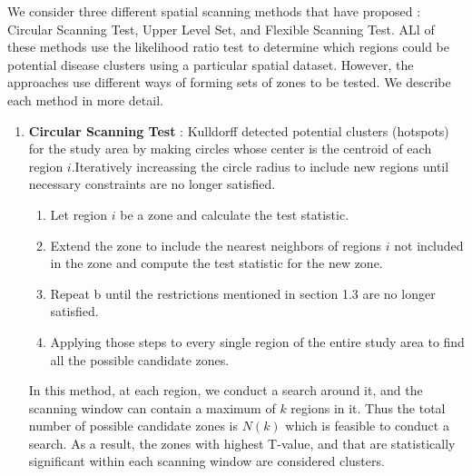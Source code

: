 \documentclass[12pt]{article}
\begin{document}
				We consider three different spatial scanning methods that have proposed : Circular Scanning Test, Upper Level Set, and Flexible Scanning Test. ALl of these methods use the likelihood ratio test to determine which regions could be potential disease clusters using a particular spatial dataset. However, the approaches use different ways of forming sets of zones to be tested. We describe each method in more detail.\\			
				\begin{enumerate}
			\item \textbf{Circular Scanning Test} : Kulldorff detected potential clusters (hotspots) for the study area by making circles whose center is the centroid of each region $i$.Iteratively increassing the circle radius to include new regions until necessary constraints are no longer satisfied. 
	
			\begin{enumerate}
				\item Let region $i$ be a zone and calculate the test statistic. 
				\item Extend the zone to include the nearest neighbors of regions $i$ not included in the zone and compute the test statistic for the new zone. 
				\item Repeat b until the restrictions mentioned in section 1.3 are no longer satisfied.  
				\item Applying those steps to every single region of the entire study area to find all the possible candidate zones. 
			\end{enumerate}  
		In this method, at each region, we conduct a search around it, and the scanning window can contain a maximum of $k$ regions in it. Thus the total number of possible candidate zones is $N(k)$ which is feasible to conduct a search.
		As a result, the zones with highest T-value, and that are statistically significant within each scanning window are considered clusters. \\
			

\end{enumerate}
\end{document}

